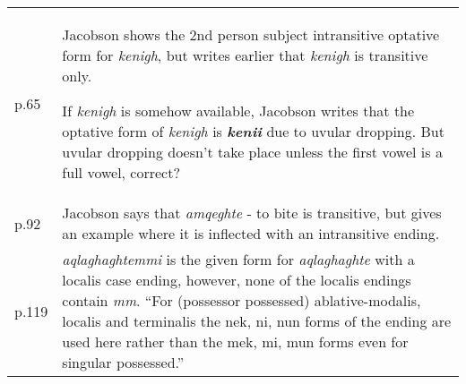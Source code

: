 \documentclass{article}
\begin{document}
\begin{tabular}{p{1cm}p{10.5cm}}
p.65 & 	Jacobson shows the 2nd person subject intransitive optative form for \textit{kenigh}, but writes earlier that \textit{kenigh} is transitive only.

If \textit{kenigh} is somehow available, Jacobson writes that the optative form of \textit{kenigh} is \textit{\textbf{kenii}} due to uvular dropping.
%
But uvular dropping doesn't take place unless the first vowel is a full vowel, correct? \\

p.92 & Jacobson says that \textit{amqeghte} - to bite is transitive, but gives an example where it is inflected with an intransitive ending. \\

p.119 & \textit{aqlaghaghtemmi} is the given form for \textit{aqlaghaghte} with a localis case ending, however, none of the localis endings contain \textit{mm}.
%
``For (possessor possessed) ablative-modalis, localis and terminalis the nek, ni, nun forms of the ending are used here rather than the mek, mi, mun forms even for singular possessed.''

\end{tabular}
\end{document}
